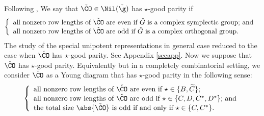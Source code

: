 \documentclass[ssunip.tex]{subfiles}
\begin{document}
  Following \cite[Definition 4.1]{MR},  We say that
    $\check \CO\in \Nil(\check \g)$ has  $\star$-good parity if
\[
  \left\{ \begin{array}{l}
               \textrm{all nonzero row lengths of $\check \CO$ are even if $\check G$ is a complex symplectic group; and }\\
                     \textrm{all nonzero row lengths of $\check \CO$ are odd if $\check G$ is a complex orthogonal group.}
                          \end{array}
                 \right.
\]
The study of the special unipotent representations in general case reduced to the case when $\check \CO$ has $\star$-good parity. See Appendix \ref{secapp}. Now we suppose that  $\check \CO$ has  $\star$-good parity. Equivalently but in a completely combinatorial setting, we consider $\check \CO$ as a Young diagram that has  $\star$-good parity in the following sense:
\[
  \left\{ \begin{array}{l}
               \textrm{all nonzero row lengths of $\check \CO$ are even if $\star\in \{B, \widetilde{C}\}$;}\\
                     \textrm{all nonzero row lengths of $\check \CO$ are odd if $\star\in \{C, D, C^*, D^*\}$; and}\\
                        \textrm{the total size $\abs{\check \CO}$ is  odd if and only if $\star\in \{C, C^*\}$}.                   \end{array}
                 \right.
\]

\end{document}
